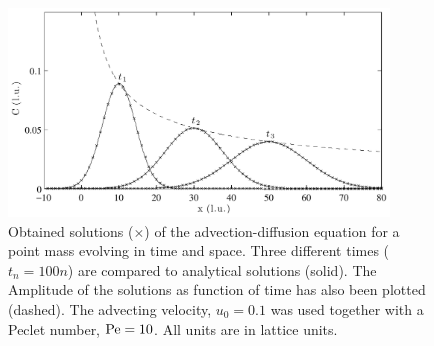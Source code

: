 \begin{figure}
\begin{center}
\includegraphics[width=0.9\textwidth]{fig/adv_dif_10_30_50.pdf}
\end{center}
\caption{Obtained solutions ($\times$) of the advection-diffusion
  equation for a point mass evolving in time and space. Three
  different times ($t_n = 100n$) are compared to analytical solutions
  (solid). The Amplitude of the solutions as function of time has also
  been plotted (dashed). The advecting velocity, $u_0 = 0.1$ was used
  together with a Peclet number, $\mathrm{Pe} = 10$. All units are in lattice
  units.}
\label{fig:adv-dif}
\end{figure}
